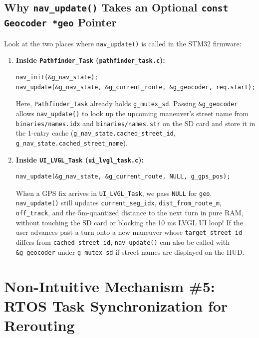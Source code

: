 \documentclass[11pt,a4paper]{article}
\begin{document}
\subsection{Why \texttt{nav\_update()} Takes an Optional \texttt{const Geocoder *geo} Pointer}

Look at the two places where \texttt{nav\_update()} is called in the STM32 firmware:
\begin{enumerate}
    \item \textbf{Inside \texttt{Pathfinder\_Task} (\texttt{pathfinder\_task.c}):}
    \begin{lstlisting}
nav_init(&g_nav_state);
nav_update(&g_nav_state, &g_current_route, &g_geocoder, req.start);
    \end{lstlisting}
    Here, \texttt{Pathfinder\_Task} already holds \texttt{g\_mutex\_sd}. Passing \texttt{\&g\_geocoder} allows \texttt{nav\_update()} to look up the upcoming maneuver's street name from \texttt{binaries/names.idx} and \texttt{binaries/names.str} on the SD card and store it in the 1-entry cache (\texttt{g\_nav\_state.cached\_street\_id}, \texttt{g\_nav\_state.cached\_street\_name}).
    \item \textbf{Inside \texttt{UI\_LVGL\_Task} (\texttt{ui\_lvgl\_task.c}):}
    \begin{lstlisting}
nav_update(&g_nav_state, &g_current_route, NULL, g_gps_pos);
    \end{lstlisting}
    When a GPS fix arrives in \texttt{UI\_LVGL\_Task}, we pass \texttt{NULL} for \texttt{geo}. \texttt{nav\_update()} still updates \texttt{current\_seg\_idx}, \texttt{dist\_from\_route\_m}, \texttt{off\_track}, and the 5m-quantized distance to the next turn in pure RAM, without touching the SD card or blocking the 10 ms LVGL UI loop! If the user advances past a turn onto a new maneuver whose \texttt{target\_street\_id} differs from \texttt{cached\_street\_id}, \texttt{nav\_update()} can also be called with \texttt{\&g\_geocoder} under \texttt{g\_mutex\_sd} if street names are displayed on the HUD.
\end{enumerate}

\section{Non-Intuitive Mechanism \#5: RTOS Task Synchronization for Rerouting}
\end{document}
